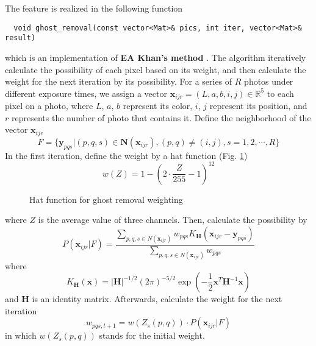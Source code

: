 The feature is realized in the following function
\begin{lstlisting}
  void ghost_removal(const vector<Mat>& pics, int iter, vector<Mat>& result)
\end{lstlisting}
which is an implementation of \textbf{EA Khan's method} \cite{ref:ghost-removal}. The algorithm iteratively calculate the possibility of each pixel based on its weight, and then calculate the weight for the next iteration by its possibility. For a series of $R$ photos under different exposure times, we assign a vector $\textbf{x}_{ijr}=(L, a, b, i, j)\in \mathbb{R}^5$ to each pixel on a photo, where $L$, $a$, $b$ represent its color, $i$, $j$ represent its position, and $r$ represents the number of photo that contains it. Define the neighborhood of the vector $\textbf{x}_{ijr}$
$$F=\{ \textbf{y}_{pqs}|(p,q,s)\in\textbf{N}(\textbf{x}_{ijr}), (p,q)\neq(i,j), s=1,2,\cdots,R \}$$
In the first iteration, define the weight by a hat function (Fig. \ref{fig:hat})
$$w(Z)=1-\left(2\cdot\frac{Z}{255}-1\right)^{12}$$

\begin{figure}[!ht]
\center
{}
\caption{Hat function for ghost removal weighting}
\label{fig:hat}
\end{figure}

where $Z$ is the average value of three channels. Then, calculate the possibility by
$$ 
P(\textbf{x}_{ijr}|F)=
\frac{
  \sum_{p,q,s\in N(\textbf{x}_{ijr})}w_{pqs}K_\textbf{H}(\textbf{x}_{ijr}-\textbf{y}_{pqs})
  }{
    \sum_{p,q,s\in N(\textbf{x}_{ijr})}w_{pqs}
  } 
$$
where
$$K_\textbf{H}(\textbf{x})=|\textbf{H}|^{-1/2}(2\pi)^{-5/2}\exp(-\frac{1}{2}\textbf{x}^T\textbf{H}^{-1}\textbf{x})$$
and $\textbf{H}$ is an identity matrix. Afterwards, calculate the weight for the next iteration
$$w_{pqs, t+1}=w(Z_s(p,q))\cdot P(\textbf{x}_{ijr}|F)$$
in which $w(Z_s(p,q))$ stands for the initial weight.

